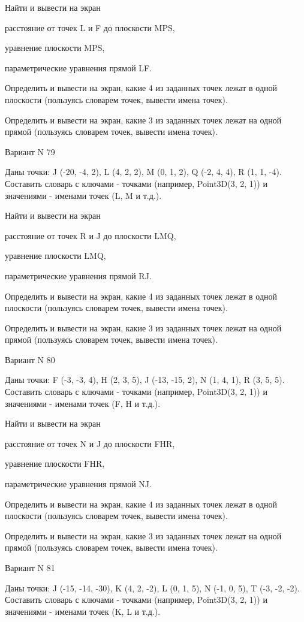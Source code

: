 \documentclass[11pt]{report}
\begin{document}
 
Найти и вывести на экран


расстояние от точек L и F до плоскости MPS,

 
уравнение плоскости MPS,

 
параметрические уравнения прямой LF.


Определить и вывести на экран, какие 4 из заданных точек лежат в одной плоскости (пользуясь словарем точек, вывести имена точек).


Определить и вывести на экран, какие 3 из заданных точек лежат на одной прямой (пользуясь словарем точек, вывести имена точек).

Вариант N 79

Даны точки: J (-20, -4, 2), L (4, 2, 2), M (0, 1, 2), Q (-2, 4, 4), R (1, 1, -4).
Составить словарь с ключами - точками (например, Point3D(3, 2, 1)) и значениями - именами точек (L, M и т.д.).

 
Найти и вывести на экран


расстояние от точек R и J до плоскости LMQ,

 
уравнение плоскости LMQ,

 
параметрические уравнения прямой RJ.


Определить и вывести на экран, какие 4 из заданных точек лежат в одной плоскости (пользуясь словарем точек, вывести имена точек).


Определить и вывести на экран, какие 3 из заданных точек лежат на одной прямой (пользуясь словарем точек, вывести имена точек).

Вариант N 80

Даны точки: F (-3, -3, 4), H (2, 3, 5), J (-13, -15, 2), N (1, 4, 1), R (3, 5, 5).
Составить словарь с ключами - точками (например, Point3D(3, 2, 1)) и значениями - именами точек (F, H и т.д.).

 
Найти и вывести на экран


расстояние от точек N и J до плоскости FHR,

 
уравнение плоскости FHR,

 
параметрические уравнения прямой NJ.


Определить и вывести на экран, какие 4 из заданных точек лежат в одной плоскости (пользуясь словарем точек, вывести имена точек).


Определить и вывести на экран, какие 3 из заданных точек лежат на одной прямой (пользуясь словарем точек, вывести имена точек).

Вариант N 81

Даны точки: J (-15, -14, -30), K (4, 2, -2), L (0, 1, 5), N (-1, 0, 5), T (-3, -2, -2).
Составить словарь с ключами - точками (например, Point3D(3, 2, 1)) и значениями - именами точек (K, L и т.д.).
\end{document}
